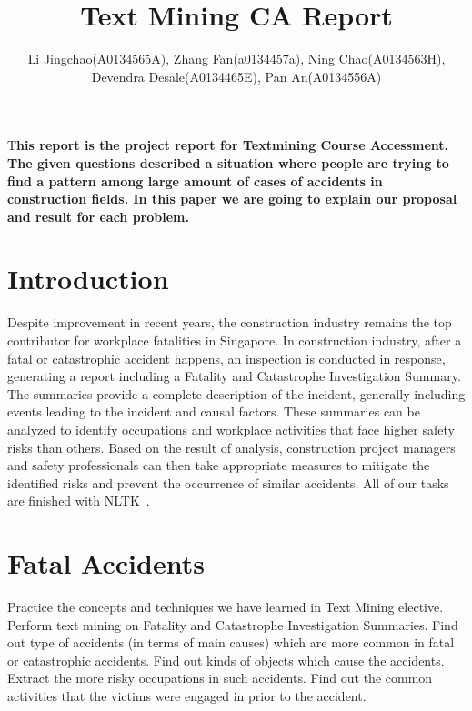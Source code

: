 \documentclass[DIV=calc, paper=a4, fontsize=11pt, twocolumn]{scrartcl}	 %
\title{\Huge Text Mining CA Report} %
\author{Li Jingchao(A0134565A), Zhang Fan(a0134457a), Ning
  Chao(A0134563H), Devendra Desale(A0134465E), Pan An(A0134556A) } %
\date{} %
\newcommand{\initial}[1]{ %
\lettrine[lines=3,lhang=0.3,nindent=0em]{
\color{DarkGoldenrod}
{\textsf{#1}}}{}}
\begin{document}
\maketitle %

\thispagestyle{fancy} %


\initial{T}\textbf{his report is the project report for Textmining
  Course Accessment.
The given questions described a situation where people are trying to
find a pattern among large amount of cases of accidents in construction
fields.
In this paper we are going to
  explain our proposal and result for  each problem.  }

\tableofcontents %

\section*{Introduction}
Despite improvement in recent years, the construction industry remains
the top contributor for workplace fatalities in Singapore. In
construction industry, after a fatal or catastrophic accident happens,
an inspection is conducted in response, generating a report including
a Fatality and Catastrophe Investigation Summary. The summaries
provide a complete description of the incident, generally including
events leading to the incident and causal factors. These summaries can
be analyzed to identify occupations and workplace activities that face
higher safety risks than others. Based on the result of analysis,
construction project managers and safety professionals can then take
appropriate measures to mitigate the identified risks and prevent the
occurrence of similar accidents. All of our tasks are finished with NLTK~\cite{nltk}.

\section{Fatal Accidents}
Practice the concepts and techniques we have learned in Text Mining
elective. Perform text mining on Fatality and Catastrophe
Investigation Summaries. Find out type of accidents (in terms of main
causes) which are more common in fatal or catastrophic accidents. Find
out kinds of objects which cause the accidents. Extract the more risky
occupations in such accidents. Find out the common activities that the
victims were engaged in prior to the accident.
\end{document}
